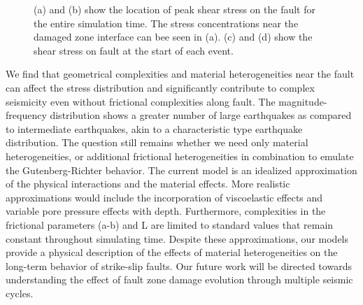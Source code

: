 \documentclass[11pt]{article}
\begin{document}
\begin{figure}[!htb]
{    }
    \caption{(a) and (b) show the location of peak shear stress on the fault for the entire simulation time. The stress concentrations near the damaged zone interface can bee seen in (a). (c) and (d) show the shear stress on fault at the start of each event.}
\end{figure}

We find that geometrical complexities and material heterogeneities near the fault can affect the stress distribution and significantly contribute to complex seismicity even without frictional complexities along fault. The magnitude-frequency distribution shows a greater number of large earthquakes as compared to intermediate earthquakes, akin to a characteristic type earthquake distribution. The question still remains whether we need only material heterogeneities, or additional frictional heterogeneities in combination to emulate the Gutenberg-Richter behavior. The current model is an idealized approximation of the physical interactions and the material effects. More realistic approximations would include the incorporation of viscoelastic effects and variable pore pressure effects with depth. Furthermore, complexities in the frictional parameters (a-b) and L are limited to standard values that remain constant throughout simulating time. Despite these approximations, our models provide a physical description of the effects of material heterogeneities on the long-term behavior of strike-slip faults. Our future work will be directed towards understanding the effect of fault zone damage evolution through multiple seismic cycles.

\clearpage
{\footnotesize


}
\end{document}
